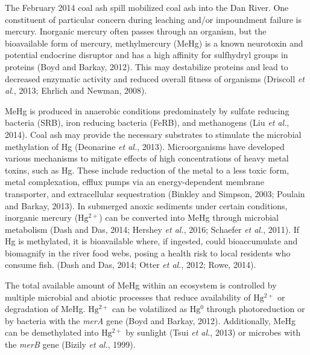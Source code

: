 \documentclass[ms, hidelinks]{uncgdissertationexp}
\theoremstyle{plain}
\theoremstyle{definition}
\theoremstyle{remark}
\begin{document}
The February 2014 coal ash spill mobilized coal ash into the Dan River. One constituent of particular concern during leaching and/or impoundment failure is mercury. Inorganic mercury often passes through an organism, but the bioavailable form of mercury, methylmercury (MeHg) is a known neurotoxin and potential endocrine disruptor and has a high affinity for sulfhydryl groups in proteins (Boyd and Barkay, 2012). This may destabilize proteins and lead to decreased enzymatic activity and reduced overall fitness of organisms (Driscoll \emph{et al.}, 2013; Ehrlich and Newman, 2008).

MeHg is produced in anaerobic conditions predominately by sulfate reducing bacteria (SRB), iron reducing bacteria (FeRB), and methanogens (Liu \emph{et al.}, 2014). Coal ash may provide the necessary substrates to stimulate the microbial methylation of Hg (Deonarine \emph{et al.}, 2013). Microorganisms have developed various mechanisms to mitigate effects of high concentrations of heavy metal toxins, such as Hg. These include reduction of the metal to a less toxic form, metal complexation, efflux pumps via an energy-dependent membrane transporter, and extracellular sequestration (Binkley and Simpson, 2003; Poulain and Barkay, 2013).
In submerged anoxic sediments under certain conditions, inorganic mercury (\(\mathrm{Hg^{2+}}\)) can be converted into MeHg through microbial metabolism (Dash and Das, 2014; Hershey \emph{et al.}, 2016; Schaefer \emph{et al.}, 2011). If Hg is methylated, it is bioavailable where, if ingested, could bioaccumulate and biomagnify in the river food webs, posing a health risk to local residents who consume fish. (Dash and Das, 2014; Otter \emph{et al.}, 2012; Rowe, 2014).

The total available amount of MeHg within an ecosystem is controlled by multiple microbial and abiotic processes that reduce availability of \(\mathrm{Hg^{2+}}\) or degradation of MeHg. \(\mathrm{Hg^{2+}}\) can be volatilized as \(\mathrm{Hg^{0}}\) through photoreduction or by bacteria with the \emph{merA} gene (Boyd and Barkay, 2012). Additionally, MeHg can be demethylated into \(\mathrm{Hg^{2+}}\) by sunlight (Tsui \emph{et al.}, 2013) or microbes with the \emph{merB} gene (Bizily \emph{et al.}, 1999).
\end{document}
